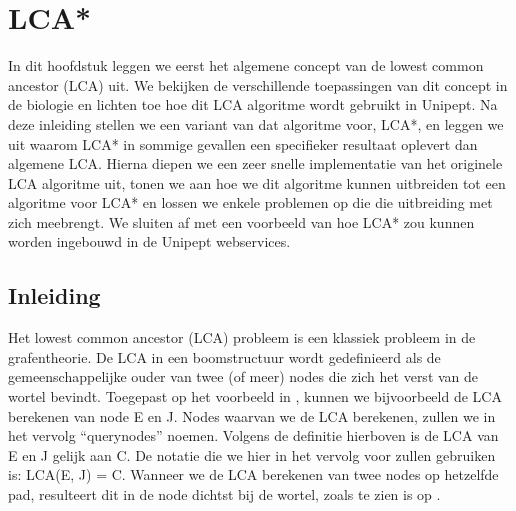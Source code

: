 \chapter{LCA*}
\label{chap:lca*}

In dit hoofdstuk leggen we eerst het algemene concept van de lowest common
ancestor (LCA) uit. We bekijken de verschillende toepassingen van dit concept in
de biologie en lichten toe hoe dit LCA algoritme wordt gebruikt in
Unipept. Na deze inleiding stellen we een variant van dat algoritme voor,
LCA*, en leggen we uit waarom LCA* in sommige gevallen een specifieker
resultaat oplevert dan algemene LCA. Hierna diepen we een zeer snelle
implementatie van het originele LCA algoritme uit, tonen we aan hoe we dit
algoritme kunnen uitbreiden tot een algoritme voor LCA* en lossen we enkele 
problemen op die die uitbreiding met zich meebrengt. We sluiten af met een
voorbeeld van hoe LCA* zou kunnen worden ingebouwd in de Unipept webservices.

\section{Inleiding}
Het lowest common ancestor (LCA) probleem is een klassiek probleem in de
grafentheorie. De LCA in een boomstructuur wordt gedefinieerd als de
gemeenschappelijke ouder van twee (of meer) nodes die zich het verst van de
wortel bevindt. Toegepast op het voorbeeld in , kunnen
we bijvoorbeeld de LCA berekenen van node E en J. Nodes waarvan we de LCA
berekenen, zullen we in het vervolg ``querynodes'' noemen. Volgens de definitie
hierboven is de LCA van E en J gelijk aan C. De notatie die we hier in het
vervolg voor zullen gebruiken is: LCA(E, J) = C. Wanneer we de LCA berekenen van
twee nodes op hetzelfde pad, resulteert dit in de node dichtst bij de wortel,
zoals te zien is op .

